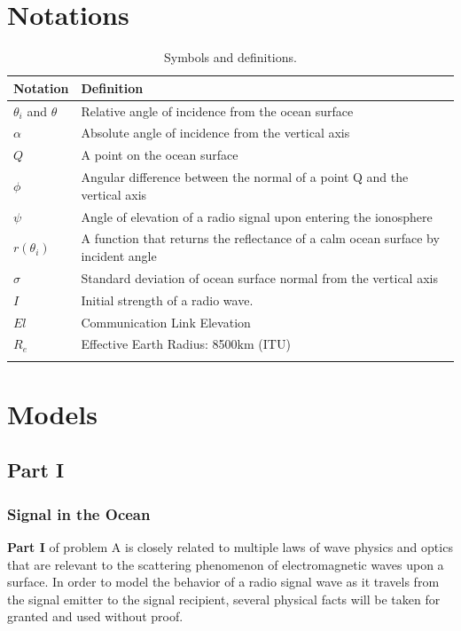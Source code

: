 \documentclass{article}
\begin{document}
{\renewcommand{\arraystretch}{1.3}%
\section{Notations}
\begin{center}
    \begin{longtable}{l l{500pt}}
        Notation & Definition \\
        \hline
        $\theta_i$ and $\theta$ & Relative angle of incidence from the ocean surface \\
        $\alpha$ & Absolute angle of incidence from the vertical axis\\
        $Q$ & A point on the ocean surface\\
        $\phi$ & Angular difference between the normal of a point Q and the vertical axis \\
        $\psi$ & Angle of elevation of a radio signal upon entering the ionosphere\\
        $r(\theta_i)$ & A function that returns the reflectance of a calm ocean surface by incident angle\\
        $\sigma$ & Standard deviation of ocean surface normal from the vertical axis\\
        $I$ & Initial strength of a radio wave.\\
        $El$ & Communication Link Elevation\\
        $R_e$ & Effective Earth Radius: 8500km (ITU)\\[20pt]
        \caption{Symbols and definitions.}
    \end{longtable}
    \label{tab:symbol_def}
\end{center}
}


\section{Models}
\subsection{Part I}
\subsubsection{Signal in the Ocean}
\textbf{Part I} of problem A is closely related to multiple laws of wave physics and optics that are relevant to the scattering phenomenon of electromagnetic waves upon a surface. In order to model the behavior of a radio signal wave as it travels from the signal emitter to the signal recipient, several physical facts will be taken for granted and used without proof.
\end{document}
